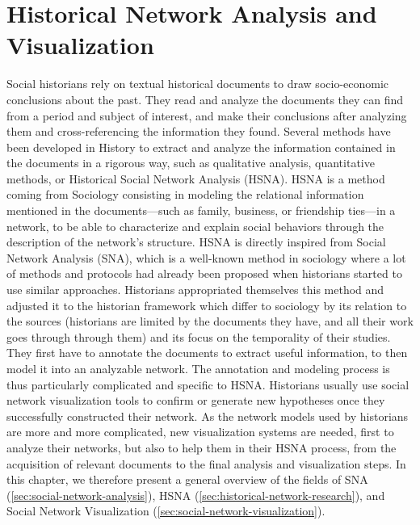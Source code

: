 
\chapter{Historical Network Analysis and Visualization}\label{ch:related-work}

Social historians rely on textual historical documents to draw socio-economic conclusions about the past.
They read and analyze the documents they can find from a period and subject of interest, and make their conclusions after analyzing them and cross-referencing the information they found.
Several methods have been developed in History to extract and analyze the information contained in the documents in a rigorous way, such as qualitative analysis, quantitative methods, or Historical Social Network Analysis (HSNA).
HSNA is a method coming from Sociology consisting in modeling the relational information mentioned in the documents---such as family, business, or friendship ties---in a network, to be able to characterize and explain social behaviors through the description of the network's structure.
HSNA is directly inspired from Social Network Analysis (SNA), which is a well-known method in sociology where a lot of methods and protocols had already been proposed when historians started to use similar approaches.
Historians appropriated themselves this method and adjusted it to the historian framework which differ to sociology by its relation to the sources (historians are limited by the documents they have, and all their work goes through through them) and its focus on the temporality of their studies.
They first have to annotate the documents to extract useful information, to then model it into an analyzable network.
The annotation and modeling process is thus particularly complicated and specific to HSNA.
Historians usually use social network visualization tools to confirm or generate new hypotheses once they successfully constructed their network.
As the network models used by historians are more and more complicated, new visualization systems are needed, first to analyze their networks, but also to help them in their HSNA process, from the acquisition of relevant documents to the final analysis and visualization steps.
In this chapter, we therefore present a general overview of the fields of SNA (\autoref{sec:social-network-analysis}), HSNA (\autoref{sec:historical-network-research}), and Social Network Visualization (\autoref{sec:social-network-visualization}).

